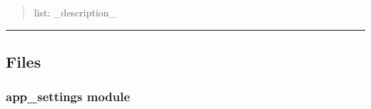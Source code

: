 \documentclass[letterpaper,10pt,english]{sphinxmanual}
\begin{document}
\begin{savenotes}
\begin{fulllineitems}
\begin{savenotes}
\begin{fulllineitems}
\begin{quote}
\begin{description}
\sphinxAtStartPar
list: \_description\_

\end{description}\end{quote}

\end{fulllineitems}\end{savenotes}


\begin{savenotes}\begin{fulllineitems}
\label{\detokenize{setting/utils/move_on_list:oxin.utils.move_on_list.moveOnList.next_on_list}}
\pysigstartsignatures
{}
\pysigstopsignatures
\end{fulllineitems}\end{savenotes}


\begin{savenotes}\begin{fulllineitems}
\label{\detokenize{setting/utils/move_on_list:oxin.utils.move_on_list.moveOnList.prev_on_list}}
\pysigstartsignatures
{}
\pysigstopsignatures
\end{fulllineitems}\end{savenotes}


\end{fulllineitems}\end{savenotes}



\bigskip\hrule\bigskip



\subsection{Files}
\label{\detokenize{Setting Software:files}}
\sphinxstepscope


\subsubsection{app\_settings module}
\label{\detokenize{setting/app_settings:module-oxin.app_settings}}\label{\detokenize{setting/app_settings:app-settings-module}}\label{\detokenize{setting/app_settings::doc}}
\end{document}
